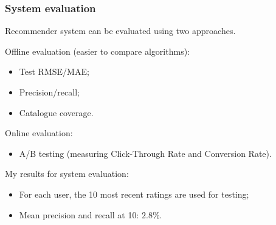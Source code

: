 \documentclass[xcolor = {table}]{beamer}
\begin{document}
  \begin{frame}
    \frametitle{System evaluation}

    Recommender system can be evaluated using two approaches.

    \vspace{1em}

    Offline evaluation (easier to compare algorithms):
    \begin{itemize}
      \item Test RMSE/MAE;
      \item Precision/recall;
      \item Catalogue coverage.
    \end{itemize}

    \vspace{0.5em}

    Online evaluation:
    \begin{itemize}
      \item A/B testing (measuring Click-Through Rate and Conversion Rate).
    \end{itemize}

    \vspace{1em}

    \pause

    My results for system evaluation:

    \begin{itemize}
      \item For each user, the 10 most recent ratings are used for testing;
      \item Mean precision and recall at 10: $2.8\%$.
    \end{itemize}

  \end{frame}
\end{document}
